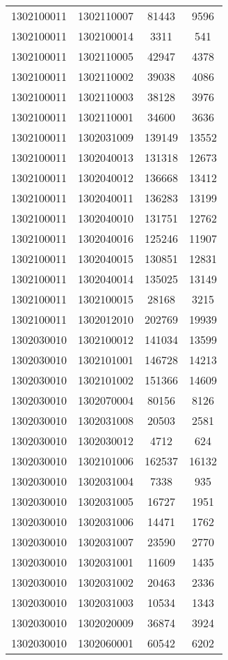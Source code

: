 \begin{longtable}{llcc}
1302100011 & 1302110007 & 81443 & 9596\\
1302100011 & 1302100014 & 3311 & 541\\
1302100011 & 1302110005 & 42947 & 4378\\
1302100011 & 1302110002 & 39038 & 4086\\
1302100011 & 1302110003 & 38128 & 3976\\
1302100011 & 1302110001 & 34600 & 3636\\
1302100011 & 1302031009 & 139149 & 13552\\
1302100011 & 1302040013 & 131318 & 12673\\
1302100011 & 1302040012 & 136668 & 13412\\
1302100011 & 1302040011 & 136283 & 13199\\
1302100011 & 1302040010 & 131751 & 12762\\
1302100011 & 1302040016 & 125246 & 11907\\
1302100011 & 1302040015 & 130851 & 12831\\
1302100011 & 1302040014 & 135025 & 13149\\
1302100011 & 1302100015 & 28168 & 3215\\
1302100011 & 1302012010 & 202769 & 19939\\
1302030010 & 1302100012 & 141034 & 13599\\
1302030010 & 1302101001 & 146728 & 14213\\
1302030010 & 1302101002 & 151366 & 14609\\
1302030010 & 1302070004 & 80156 & 8126\\
1302030010 & 1302031008 & 20503 & 2581\\
1302030010 & 1302030012 & 4712 & 624\\
1302030010 & 1302101006 & 162537 & 16132\\
1302030010 & 1302031004 & 7338 & 935\\
1302030010 & 1302031005 & 16727 & 1951\\
1302030010 & 1302031006 & 14471 & 1762\\
1302030010 & 1302031007 & 23590 & 2770\\
1302030010 & 1302031001 & 11609 & 1435\\
1302030010 & 1302031002 & 20463 & 2336\\
1302030010 & 1302031003 & 10534 & 1343\\
1302030010 & 1302020009 & 36874 & 3924\\
1302030010 & 1302060001 & 60542 & 6202\\

\end{longtable}
